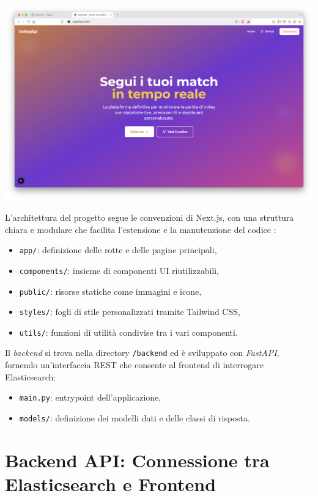 \documentclass[a4paper,12pt]{report}
\begin{document}
\noindent\begin{minipage}{\textwidth}
  \centering
    \includegraphics[width=\textwidth]{home.png}
    \label{fig:home web app}
\end{minipage}



L’architettura del progetto segue le convenzioni di Next.js, con una struttura chiara e modulare che facilita l’estensione e la manutenzione del codice : 
\begin{itemize}
    \item \texttt{app/}: definizione delle rotte e delle pagine principali,
    \item \texttt{components/}: insieme di componenti UI riutilizzabili,
    \item \texttt{public/}: risorse statiche come immagini e icone,
    \item \texttt{styles/}: fogli di stile personalizzati tramite Tailwind CSS,
    \item \texttt{utils/}: funzioni di utilità condivise tra i vari componenti.
\end{itemize}

Il \textit{backend} si trova nella directory \texttt{/backend} ed è sviluppato con \textit{FastAPI}, fornendo un'interfaccia REST che consente al frontend di interrogare Elasticsearch:
\begin{itemize}
    \item \texttt{main.py}: entrypoint dell’applicazione,
    \item \texttt{models/}: definizione dei modelli dati e delle classi di risposta.
\end{itemize}


\section{Backend API: Connessione tra Elasticsearch e Frontend}
\end{document}
